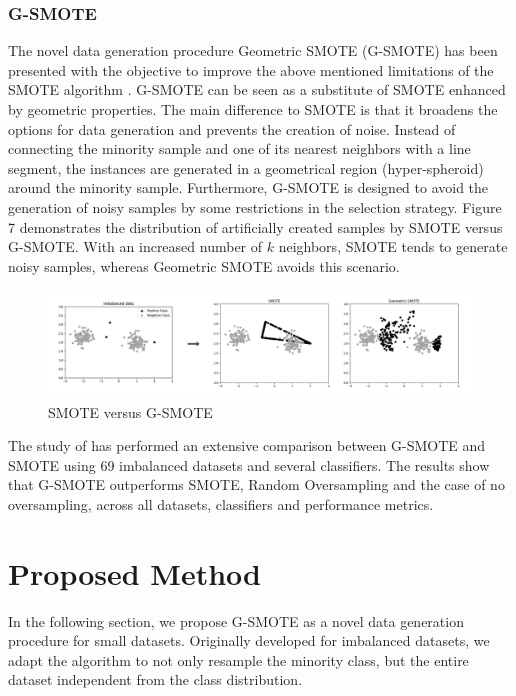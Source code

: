 \documentclass[parskip=full]{scrartcl}
\begin{document}
\subsubsection{G-SMOTE}

The novel data generation procedure Geometric SMOTE (G-SMOTE) has been 
presented with the objective to improve the above mentioned limitations of the 
SMOTE algorithm \cite{Douzas.2019b}. G-SMOTE can be seen as a substitute of 
SMOTE enhanced by geometric properties. The main difference to SMOTE is that 
it broadens the options for data generation and 
prevents the creation of noise. Instead of connecting the minority sample and one of 
its nearest neighbors with a line segment, the instances are 
generated in a geometrical region (hyper-spheroid) around the minority sample. 
Furthermore, G-SMOTE is designed to avoid the generation of noisy samples by 
some restrictions in the selection strategy. Figure 7 demonstrates the 
distribution of artificially created samples by SMOTE versus G-SMOTE. With an 
increased number of $\mathit{k}$ neighbors, SMOTE tends to generate noisy 
samples, whereas Geometric SMOTE avoids this scenario.

\begin{figure}[H]
	\centering
	\includegraphics[width=1\linewidth]{./resources/smote_vs_gsmote}
	\caption{SMOTE versus G-SMOTE \cite{Douzas.2019}}
	\label{fig:smotevsgsmote}
\end{figure}

The study of \cite{Douzas.2019b} has performed an extensive comparison between 
G-SMOTE and SMOTE using 69 imbalanced datasets and several classifiers. The 
results show that G-SMOTE outperforms SMOTE, Random Oversampling and the case 
of no oversampling, across all datasets, classifiers and performance 
metrics.

\section{Proposed Method}

In the following section, we propose G-SMOTE as a novel data generation procedure 
for small datasets. Originally developed for imbalanced datasets, we 
adapt the algorithm to not only resample the minority class, but the 
entire dataset independent from the class distribution. 
\end{document}
